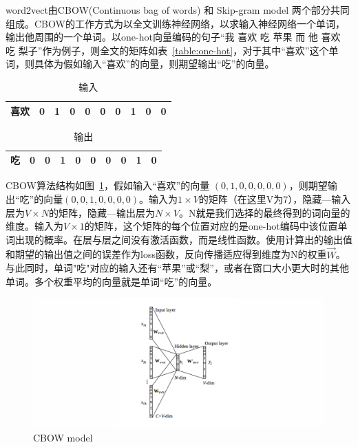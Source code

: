 word2vect由CBOW(Continuous bag of words) 和 Skip-gram model 两个部分共同组成。\cite{DBLP:journals/corr/abs-1708-00107}CBOW的工作方式为以全文训练神经网络，以求输入神经网络一个单词，输出他周围的一个单词。以one-hot向量编码的句子“我 喜欢 吃 苹果 而 他 喜欢 吃 梨子”作为例子，则全文的矩阵如表~\ref{table:one-hot}，对于其中“喜欢”这个单词，则具体为假如输入“喜欢”的向量，则期望输出“吃”的向量。\cite{Mikolov:2013:DRW:2999792.2999959}

\begin{table}[!htbp]
\caption{输入}
\label{table:cbow-input}
\centering
\begin{tabular}{|c|c|c|c|c|c|c|c|c|c|}
\hline
喜欢 & 0 & 1 & 0 & 0 & 0 & 0 & 1 & 0 & 0 \\
\hline
\end{tabular}
\end{table}

\begin{table}[!htbp]
\caption{输出}
\label{table:cbow-output}
\centering
\begin{tabular}{|c|c|c|c|c|c|c|c|c|c|}
\hline
吃 & 0 & 0 & 1 & 0 & 0 & 0 & 0 & 1 & 0 \\
\hline
\end{tabular}
\end{table}

CBOW算法结构如图~\ref{figure:CBOW网络结构}，假如输入“喜欢”的向量 $(0,1,0,0,0,0,0)$，则期望输出“吃”的向量$(0,0,1,0,0,0,0)$。输入为${1}\times{V}$的矩阵（在这里V为7），隐藏—输入层为${V}\times{N}$的矩阵，隐藏—输出层为${N}\times{V}$。N就是我们选择的最终得到的词向量的维度。输入为${V}\times{1}$的矩阵，这个矩阵的每个位置对应的是one-hot编码中该位置单词出现的概率。在层与层之间没有激活函数，而是线性函数。使用计算出的输出值和期望的输出值之间的误差作为loss函数，反向传播适应得到维度为N的权重$\vec{W}$。与此同时，单词"吃"对应的输入还有“苹果”或“梨”，或者在窗口大小更大时的其他单词。多个权重平均的向量就是单词“吃”的向量。

\begin{figure}[!htbp]
\centering
\includegraphics[width=\linewidth,keepaspectratio]{data/chapter-1/Screenshot-from-2017-06-04-22-05-44.png}
\caption{CBOW model}
\label{figure:CBOW网络结构}
\end{figure}

